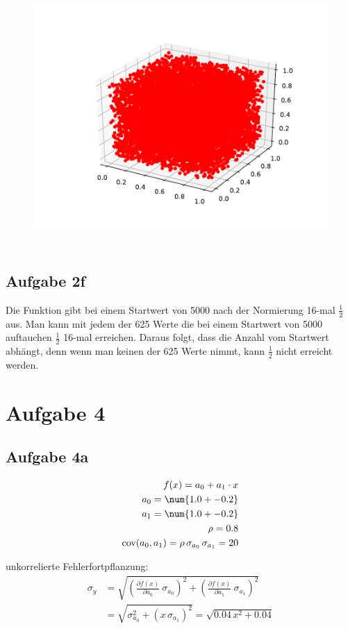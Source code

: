 \begin{figure}[H]
  \includegraphics[height=10cm]{Python/Aufgabe2e3.pdf}
\end{figure}

\subsection*{Aufgabe 2f}
Die Funktion gibt bei einem Startwert von 5000 nach der Normierung 16-mal $\frac{1}{2}$ aus. Man kann mit jedem der 625 Werte die bei einem Startwert von 5000 auftauchen $\frac{1}{2}$ 16-mal erreichen. Daraus folgt, dass die Anzahl vom Startwert abhängt, denn wenn man keinen der 625 Werte nimmt, kann $\frac{1}{2}$ nicht erreicht werden.

\section*{Aufgabe 4}
\subsection*{Aufgabe 4a}
\begin{align*}
  f(x) = a_0 + a_1 \cdot x \\
  a_0 = \num{1.0 +- 0.2} \\
  a_1 = \num{1.0 +- 0.2} \\
  \rho = 0.8 \\
  \text{cov}(a_0, a_1) = \rho\,\sigma_{a_0}\,\sigma_{a_1} = 20
\end{align*}

unkorrelierte Fehlerfortpflanzung:
\begin{align*}
  \sigma_y &= \sqrt{\left(\frac{\partial f(x)}{\partial a_0}\ \sigma_{a_0} \right)^2 + \left(\frac{\partial f(x)}{\partial a_1}\ \sigma_{a_1} \right)^2} \\
  &= \sqrt{\sigma_{a_0}^2 + (x\,\sigma_{a_1})^2} = \sqrt{0.04\,x^2 + 0.04}
\end{align*}

